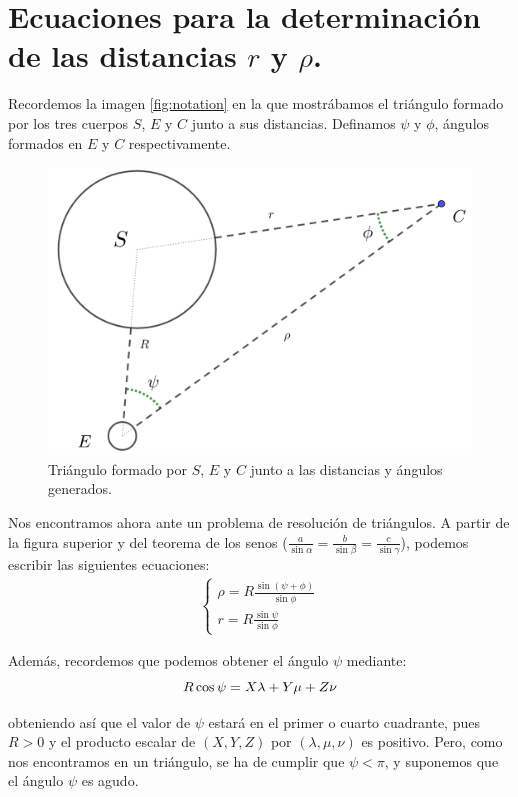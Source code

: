 \documentclass[11pt]{book}
\newcommand\ddfrac[2]{\frac{\displaystyle #1}{\displaystyle #2}}
\begin{document}
\section{Ecuaciones para la determinación de las distancias $r$ y $\rho$.}
\label{sec:distancias_r_rho}
Recordemos la imagen \ref{fig:notation} en la que mostrábamos el triángulo formado por los tres cuerpos $S$, $E$ y $C$ junto a sus distancias. Definamos $\psi$ y $\phi$, ángulos formados en $E$ y $C$ respectivamente.

\begin{figure}[H]
\centering
\includegraphics[scale=0.15]{images/notation_angles.png}
\caption{Triángulo formado por $S$, $E$ y $C$ junto a las distancias y ángulos generados.}
\label{fig:notation_angles}
\end{figure}

Nos encontramos ahora ante un problema de resolución de triángulos. A partir de la figura superior y del teorema de los senos ($\ddfrac{a}{\sin{\alpha}}=\ddfrac{b}{\sin{\beta}}=\ddfrac{c}{\sin{\gamma}}$), podemos escribir las siguientes ecuaciones:
\begin{align}
\left\{
\begin{array}{l}
	\rho=R\ddfrac{\sin{(\psi+\phi)}}{\sin{\phi}}\\
	r=R\ddfrac{\sin{\psi}}{\sin{\phi}}
\end{array}
\right.
\label{eq:triangle_relations_2}
\end{align}

Además, recordemos que podemos obtener el ángulo $\psi$ mediante:
\[
R\cos{\psi}=X\lambda+Y\mu+Z\nu\\
\]

\noindent obteniendo así que el valor de $\psi$ estará en el primer o cuarto cuadrante, pues $R>0$ y el producto escalar de $(X,Y,Z)$ por $(\lambda,\mu,\nu)$ es positivo. Pero, como nos encontramos en un triángulo, se ha de cumplir que $\psi<\pi$, y suponemos que el ángulo $\psi$ es agudo.\\
\end{document}
